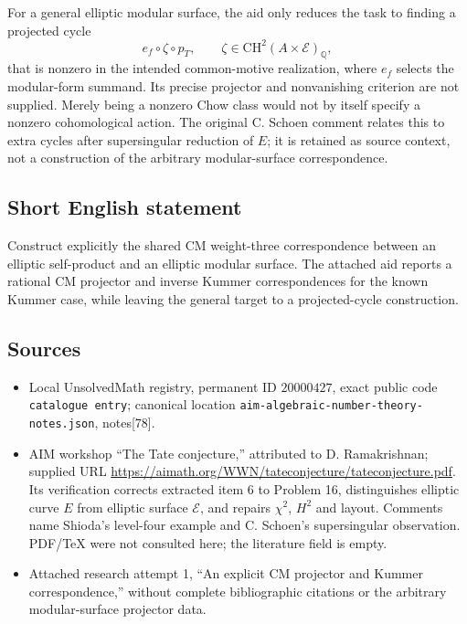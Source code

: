 \documentclass[11pt]{article}
\newcommand{\Q}{\mathbb{Q}}
\begin{document}
For a general elliptic modular surface, the aid only reduces the task to finding a projected cycle
\[
e_f\circ\zeta\circ p_T,
\qquad \zeta\in\mathrm{CH}^2(A\times\mathcal E)_{\Q},
\]
that is nonzero in the intended common-motive realization, where \(e_f\) selects the modular-form summand. Its precise projector and nonvanishing criterion are not supplied. Merely being a nonzero Chow class would not by itself specify a nonzero cohomological action. The original C. Schoen comment relates this to extra cycles after supersingular reduction of \(E\); it is retained as source context, not a construction of the arbitrary modular-surface correspondence.
\subsection{Short English statement}
Construct explicitly the shared CM weight-three correspondence between an elliptic self-product and an elliptic modular surface. The attached aid reports a rational CM projector and inverse Kummer correspondences for the known Kummer case, while leaving the general target to a projected-cycle construction.
\subsection{Sources}
\begin{itemize}
\item Local UnsolvedMath registry, permanent ID \(20000427\), exact public code \texttt{catalogue entry}; canonical location \texttt{aim-algebraic-number-theory-notes.json}, notes[78].
\item AIM workshop ``The Tate conjecture,'' attributed to D. Ramakrishnan; supplied URL \url{https://aimath.org/WWN/tateconjecture/tateconjecture.pdf}. Its verification corrects extracted item 6 to Problem 16, distinguishes elliptic curve \(E\) from elliptic surface \(\mathcal E\), and repairs \(\chi^2\), \(H^2\) and layout. Comments name Shioda's level-four example and C. Schoen's supersingular observation. PDF/TeX were not consulted here; the literature field is empty.
\item Attached research attempt 1, ``An explicit CM projector and Kummer correspondence,'' without complete bibliographic citations or the arbitrary modular-surface projector data.
\end{itemize}
\end{document}
